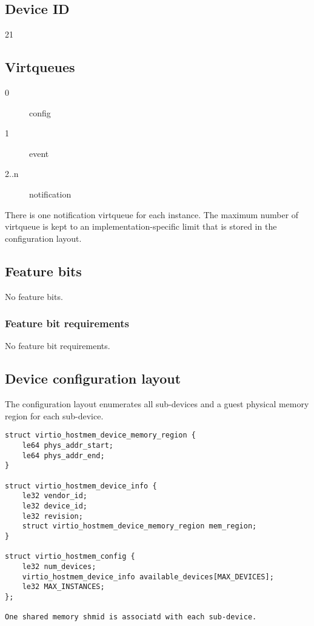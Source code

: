 \subsection{Device ID}\label{sec:Device Types / Host Memory Device / Device ID}

21

\subsection{Virtqueues}\label{sec:Device Types / Host Memory Device / Virtqueues}

\begin{description}
\item[0] config
\item[1] event
\item[2..n] notification
\end{description}

There is one notification virtqueue for each instance.
The maximum number of virtqueue is kept to an implementation-specific limit
that is stored in the configuration layout.

\subsection{Feature bits}\label{sec: Device Types / Host Memory Device / Feature bits }

No feature bits.

\subsubsection{Feature bit requirements}\label{sec:Device Types / Host Memory Device / Feature bit requirements}

No feature bit requirements.

\subsection{Device configuration layout}\label{sec:Device Types / Host Memory Device / Device configuration layout}

The configuration layout enumerates all sub-devices and a guest physical memory region
for each sub-device.

\begin{lstlisting}
struct virtio_hostmem_device_memory_region {
    le64 phys_addr_start;
    le64 phys_addr_end;
}

struct virtio_hostmem_device_info {
    le32 vendor_id;
    le32 device_id;
    le32 revision;
    struct virtio_hostmem_device_memory_region mem_region;
}

struct virtio_hostmem_config {
    le32 num_devices;
    virtio_hostmem_device_info available_devices[MAX_DEVICES];
    le32 MAX_INSTANCES;
};

One shared memory shmid is associatd with each sub-device.

\end{lstlisting}

